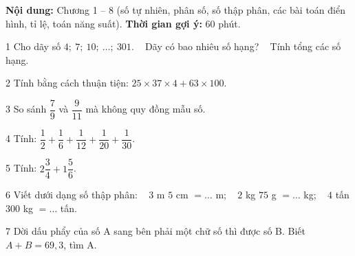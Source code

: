 \begin{knowbox}
\textbf{Nội dung:} Chương 1 -- 8 (số tự nhiên, phân số, số thập phân, các bài toán điển hình, tỉ lệ, toán năng suất). \quad \textbf{Thời gian gợi ý:} $60$ phút.
\end{knowbox}
\gap
\begin{probbox}{1}{\relax}
Cho dãy số $4;\ 7;\ 10;\ \ldots;\ 301$. \  Dãy có bao nhiêu số hạng? \  Tính tổng các số hạng.
\end{probbox}
\gap
\begin{probbox}{2}{\relax}
Tính bằng cách thuận tiện: $25\times37\times4+63\times100$.
\end{probbox}
\gap
\begin{probbox}{3}{\relax}
So sánh $\dfrac79$ và $\dfrac9{11}$ mà không quy đồng mẫu số.
\end{probbox}
\gap
\begin{probbox}{4}{\relax}
Tính: $\dfrac12+\dfrac16+\dfrac1{12}+\dfrac1{20}+\dfrac1{30}$.
\end{probbox}
\gap
\begin{probbox}{5}{\relax}
Tính: $2\dfrac34+1\dfrac56$.
\end{probbox}
\gap
\begin{probbox}{6}{\relax}
Viết dưới dạng số thập phân: \  $3$ m $5$ cm $=\ldots$ m; \  $2$ kg $75$ g $=\ldots$ kg; \  $4$ tấn $300$ kg $=\ldots$ tấn.
\end{probbox}
\gap
\begin{probbox}{7}{\relax}
Dời dấu phẩy của số A sang bên phải một chữ số thì được số B. Biết $A+B=69{,}3$, tìm A.
\end{probbox}
